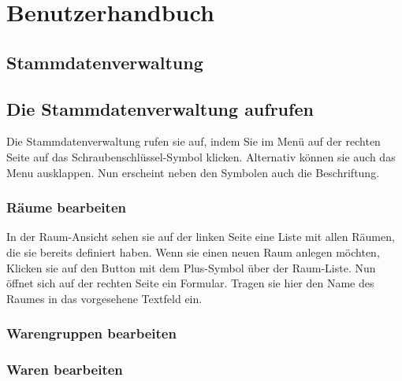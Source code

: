 \section{Benutzerhandbuch}

\subsection{Stammdatenverwaltung}

\subsection{Die Stammdatenverwaltung aufrufen}

Die Stammdatenverwaltung rufen sie auf, indem Sie im Menü auf der rechten Seite auf das Schraubenschlüssel-Symbol klicken. Alternativ können sie auch das Menu ausklappen. Nun erscheint neben den Symbolen auch die Beschriftung.

\subsubsection{Räume bearbeiten}

In der Raum-Ansicht sehen sie auf der linken Seite eine Liste mit allen Räumen, die sie bereits definiert haben. Wenn sie einen neuen Raum anlegen möchten, Klicken sie auf den Button mit dem Plus-Symbol über der Raum-Liste. Nun öffnet sich auf der rechten Seite ein Formular. Tragen sie hier den Name des Raumes in das vorgesehene Textfeld ein. 

\subsubsection{Warengruppen bearbeiten}

\subsubsection{Waren bearbeiten}
